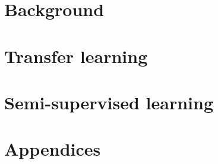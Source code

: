 % 
\pagestyle{empty}



\frontmatter






\mainmatter
\pagestyle{scrheadings}



\part{Background}
\label{part:background}



\part{Transfer learning}
\label{part:transfer}



\part{Semi-supervised learning}
\label{part:segmentation}


% 



\appendix
\part{Appendices}







\backmatter
\listoffigures
\listoftables

\printbibliography





